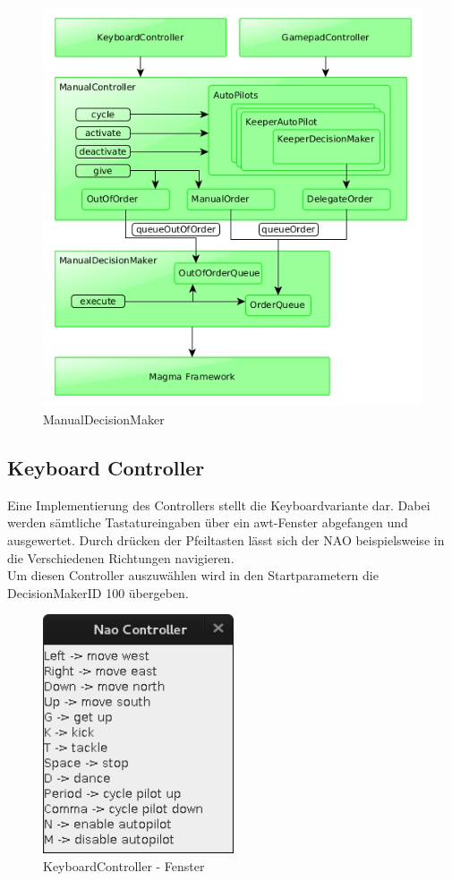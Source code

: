 \begin{figure}[H]
	\centering
	\includegraphics[width=\ScaleIfNeeded]{Grafiken/ManualCtrl/ManualDecisionMaker}
	\caption{ManualDecisionMaker}
	\label{KickMetrikAgent}
\end{figure}

\subsection{Keyboard Controller}
Eine Implementierung des Controllers stellt die Keyboardvariante dar. Dabei werden sämtliche Tastatureingaben über ein awt-Fenster abgefangen und ausgewertet. Durch drücken der Pfeiltasten lässt sich der NAO beispielsweise in die Verschiedenen Richtungen navigieren.\\
Um diesen Controller auszuwählen wird in den Startparametern die DecisionMakerID 100 übergeben.

\begin{figure}[H]
	\centering
	\includegraphics[width=160pt]{Grafiken/ManualCtrl/KeyboardController}
	\caption{KeyboardController - Fenster}
	\label{fig:keyboardcrtl}
\end{figure}



